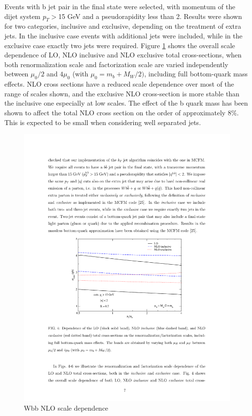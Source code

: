 Events with b jet pair in the final state were selected, with momentum of the dijet system $p_T>$15 GeV  and a pseudorapidity less than 2. Results were shown for two categories, inclusive and exclusive, depending on the treatment of extra jets. In the inclusive case events with additional jets were included, while in the exclusive case exactly two jets were required.
Figure \ref{fig:2006_scale} shows the overall scale dependence of LO, NLO inclusive and NLO exclusive total cross-sections, when both renormalization scale and factorization scale are varied independently between $\mu_0/2$ and $4\mu_0$ (with $\mu_0 = m_b + M_W /2)$, including full bottom-quark mass effects. NLO cross sections have a reduced scale dependence over most of the range of scales shown, and the exclusive NLO cross-section is more stable than the inclusive one especially at low scales.
The effect of the b quark mass has been shown to affect the total NLO cross section on the order of approximately $8\%$. This is expected to be small when considering well separated jets.
\begin{figure}[htbp]
	\centering
		\includegraphics{Figures/2006_scale.pdf}
	\caption[Wbb NLO scale dependence]{Wbb NLO scale dependence\cite{FebresCordero:2006sj}}
	\label{fig:2006_scale}
\end{figure}
